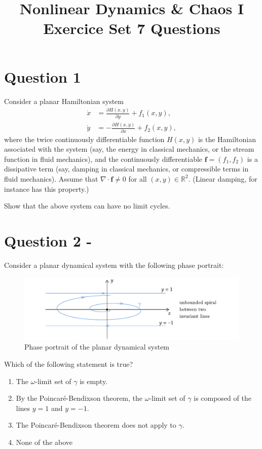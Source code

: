 \documentclass[twoside,10pt,a4paper]{article}
\title{\huge \textbf{Nonlinear Dynamics \& Chaos I \\ \Large Exercice Set 7 Questions}}	%
\author{ }		%
\date{ }	%
\begin{document}
\maketitle

\section*{Question 1}
Consider a planar Hamiltonian system
\begin{align*}
	\dot{x} &= \frac{\partial H(x,y)}{\partial y} + f_1(x,y), \\
	\dot{y} &= - \frac{\partial H(x,y)}{\partial x} + f_2(x,y),
\end{align*}
where the twice continuously differentiable function $H(x,y)$ is the Hamiltonian associated with the system (say, the energy in classical mechanics, or the stream function in fluid mechanics), and the continuously differentiable $\mathbf{f} = (f_1, f_2)$ is a dissipative term (say, damping in classical mechanics, or compressible terms in fluid mechanics). Assume that $\nabla \cdot \mathbf{f} \neq 0$ for all $(x,y) \in \mathbb{R}^2$. (Linear damping, for instance has this property.)

Show that the above system can have no limit cycles.



\section*{Question 2 -}
Consider a planar dynamical system with the following phase portrait:

\begin{figure}[H]
	\centering
	\includegraphics[scale=0.9]{Graphics/MCQ2_figures/Q04D01.pdf}
	\caption{Phase portrait of the planar dynamical system}
\end{figure}

Which of the following statement is true?

\begin{enumerate}[label=(\alph*)]
	\item The $\omega$-limit set of $\gamma$ is empty.
	\item By the Poincaré-Bendixson theorem, the $\omega$-limit set of $\gamma$ is composed of the lines $y = 1$ and $y = -1$.
	\item The Poincaré-Bendixson theorem does not apply to $\gamma$.
	\item None of the above
\end{enumerate}
\end{document}
